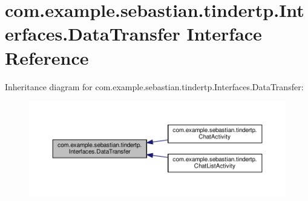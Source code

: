 \hypertarget{interfacecom_1_1example_1_1sebastian_1_1tindertp_1_1Interfaces_1_1DataTransfer}{}\section{com.\+example.\+sebastian.\+tindertp.\+Interfaces.\+Data\+Transfer Interface Reference}
\label{interfacecom_1_1example_1_1sebastian_1_1tindertp_1_1Interfaces_1_1DataTransfer}


Inheritance diagram for com.\+example.\+sebastian.\+tindertp.\+Interfaces.\+Data\+Transfer\+:
\nopagebreak
\begin{figure}[H]
\begin{center}
\leavevmode
\includegraphics[width=350pt]{interfacecom_1_1example_1_1sebastian_1_1tindertp_1_1Interfaces_1_1DataTransfer__inherit__graph}
\end{center}
\end{figure}

